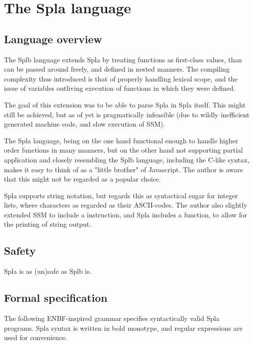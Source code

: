 \documentclass[english,10pt]{article} %
\theoremstyle{definitionstyle}
\theoremstyle{lemmastyle}
\begin{document}
\section{The Spla language}

\subsection{Language overview}

The Splb language extends Spla by treating functions as first-class values, than can be passed around freely, and defined in nested manners. The compiling complexity thus introduced is that of properly handling lexical scope, and the issue of variables outliving execution of functions in which they were defined.

The goal of this extension was to be able to parse Spla in Spla itself. This might still be achieved, but as of yet is pragmatically infeasible (due to wildly inefficient generated machine code, and slow execution of SSM).

The Spla language, being on the one hand functional enough to handle higher order functions in many manners, but on the other hand not supporting partial application and closely resembling the Splb language, including the C-like syntax, makes it easy to think of as a "little brother" of Javascript. The author is aware that this might not be regarded as a popular choice.

Spla supports string notation, but regards this as syntactical sugar for integer lists, where characters as regarded as their ASCII-codes. The author also slightly extended SSM to include a  instruction, and Spla includes a  function, to allow for the printing of string output.

\subsection{Safety}

Spla is as (un)safe as Splb is.


\subsection{Formal specification}

The following ENBF-inspired grammar specifies syntactically valid Spla programs. Spla syntax is written in bold monotype, and regular expressions are used for convenience.

\end{document}
